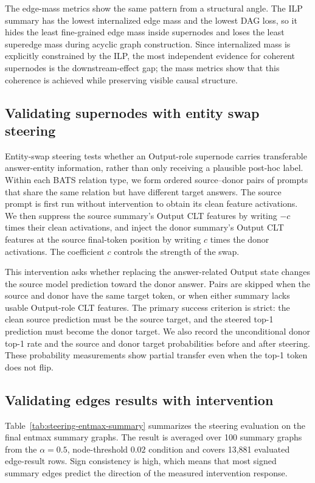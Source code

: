 \documentclass[../main.tex]{subfiles}
\begin{document}
The edge-mass metrics show the same pattern from a structural angle. The ILP
summary has the lowest internalized edge mass and the lowest DAG loss, so it
hides the least fine-grained edge mass inside supernodes and loses the least
superedge mass during acyclic graph construction. Since internalized mass is
explicitly constrained by the ILP, the most independent evidence for coherent
supernodes is the downstream-effect gap; the mass metrics show that this
coherence is achieved while preserving visible causal structure.

\subsection{Validating supernodes with entity swap steering}

Entity-swap steering tests whether an Output-role supernode carries transferable
answer-entity information, rather than only receiving a plausible post-hoc
label. Within each BATS relation type, we form ordered source--donor pairs of
prompts that share the same relation but have different target answers. The
source prompt is first run without intervention to obtain its clean feature
activations. We then suppress the source summary's Output CLT features by
writing $-c$ times their clean activations, and inject the donor summary's
Output CLT features at the source final-token position by writing $c$ times the
donor activations. The coefficient $c$ controls the strength of the swap.

This intervention asks whether replacing the answer-related Output state changes
the source model prediction toward the donor answer. Pairs are skipped when the
source and donor have the same target token, or when either summary lacks usable
Output-role CLT features. The primary success criterion is strict: the clean
source prediction must be the source target, and the steered top-1 prediction
must become the donor target. We also record the unconditional donor top-1 rate
and the source and donor target probabilities before and after steering. These
probability measurements show partial transfer even when the top-1 token does
not flip.

\subsection{Validating edges results with intervention}
Table~\ref{tab:steering-entmax-summary} summarizes the steering evaluation on
the final entmax summary graphs. The result is averaged over 100 summary graphs
from the $\alpha=0.5$, node-threshold $0.02$ condition and covers 13,881
evaluated edge-result rows. Sign consistency is high, which means that most
signed summary edges predict the direction of the measured intervention
response.
\end{document}
